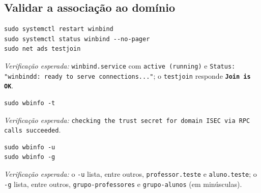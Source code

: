 
\subsection[Validar a associação ao domínio]{Validar a associação ao domínio}


\begin{lstlisting}[style=bashstyle]
sudo systemctl restart winbind
sudo systemctl status winbind --no-pager
sudo net ads testjoin
\end{lstlisting}

\emph{Verificação esperada:} \texttt{winbind.service} com \texttt{active (running)} e \texttt{Status: "winbindd: ready to serve connections..."}; o \texttt{testjoin} responde \textbf{\texttt{Join is OK}}.


\begin{lstlisting}[style=bashstyle]
sudo wbinfo -t
\end{lstlisting}

\emph{Verificação esperada:} \texttt{checking the trust secret for domain ISEC via RPC calls succeeded}.


\begin{lstlisting}[style=bashstyle]
sudo wbinfo -u
sudo wbinfo -g
\end{lstlisting}

\emph{Verificação esperada:} o \texttt{-u} lista, entre outros, \texttt{professor.teste} e \texttt{aluno.teste}; o \texttt{-g} lista, entre outros, \texttt{grupo-professores} e \texttt{grupo-alunos} (em minúsculas).

